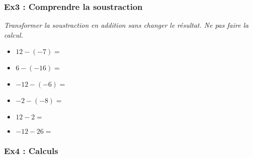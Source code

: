 \subsubsection*{Ex3 : Comprendre la soustraction}

\textit{Transformer la soustraction en addition sans changer le résultat. Ne pas faire la calcul.}

\begin{multicols}{3}

\begin{itemize}[label={$\bullet$}]
  \item $12 - (-7) = $ \dotfill
  \item $6 - (-16) = $ \dotfill
  \item $-12 - (-6) = $ \dotfill
  \item $-2 - (-8) = $ \dotfill
  \item $12 - 2 = $ \dotfill
  \item $-12 - 26 = $ \dotfill
\end{itemize}

\end{multicols}

\subsubsection*{Ex4 : Calculs}

